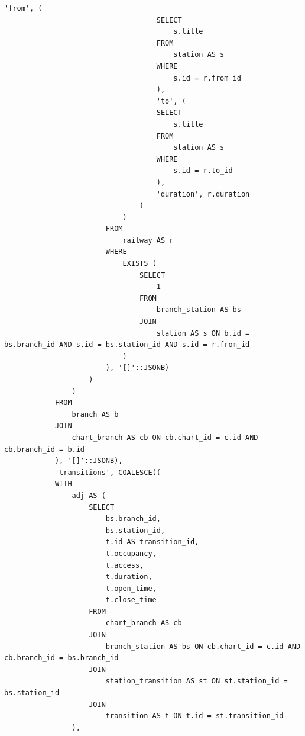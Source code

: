 \clearpage

\begin{lstlisting}[label=lst:get_chart_json_by_id:2,caption=Реализация функции получения схемы (часть 2),firstnumber=44]
                                    'from', (
                                    SELECT
                                        s.title
                                    FROM
                                        station AS s
                                    WHERE
                                        s.id = r.from_id
                                    ),
                                    'to', (
                                    SELECT
                                        s.title
                                    FROM
                                        station AS s
                                    WHERE
                                        s.id = r.to_id
                                    ),
                                    'duration', r.duration
                                )
                            )
                        FROM
                            railway AS r
                        WHERE
                            EXISTS (
                                SELECT
                                    1
                                FROM
                                    branch_station AS bs
                                JOIN
                                    station AS s ON b.id = bs.branch_id AND s.id = bs.station_id AND s.id = r.from_id
                            )
                        ), '[]'::JSONB)
                    )
                )
            FROM
                branch AS b
            JOIN
                chart_branch AS cb ON cb.chart_id = c.id AND cb.branch_id = b.id
            ), '[]'::JSONB),
            'transitions', COALESCE((
            WITH
                adj AS (
                    SELECT
                        bs.branch_id,
                        bs.station_id,
                        t.id AS transition_id,
                        t.occupancy,
                        t.access,
                        t.duration,
                        t.open_time,
                        t.close_time
                    FROM
                        chart_branch AS cb
                    JOIN
                        branch_station AS bs ON cb.chart_id = c.id AND cb.branch_id = bs.branch_id
                    JOIN
                        station_transition AS st ON st.station_id = bs.station_id
                    JOIN
                        transition AS t ON t.id = st.transition_id
                ),
\end{lstlisting}

